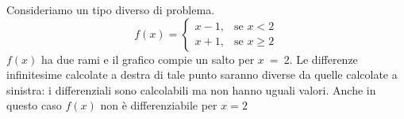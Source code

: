 \begin{inaccessibleblock}
 \begin{center}
 \begin{minipage}[]{.38 \textwidth}
  \salto
 \end{minipage} 
 \hfill
 \begin{minipage}[]{.58 \textwidth}
Consideriamo un tipo diverso di problema.\\
\[f(x)=\begin{cases} 
x-1, & \mbox{se }x<2 \\ 
x+1, & \mbox{se }x\ge 2
\end{cases}
\]
$f(x)$ ha due rami e il grafico compie un salto per $x~=~2$. Le differenze
infinitesime calcolate a destra di tale punto saranno diverse da quelle 
calcolate a sinistra: i differenziali sono calcolabili ma non hanno
uguali valori. Anche in questo caso $f(x)$ non è differenziabile per $x=2$
 \end{minipage}
 \end{center}
\end{inaccessibleblock}
\label{fig:diff01_salto}


